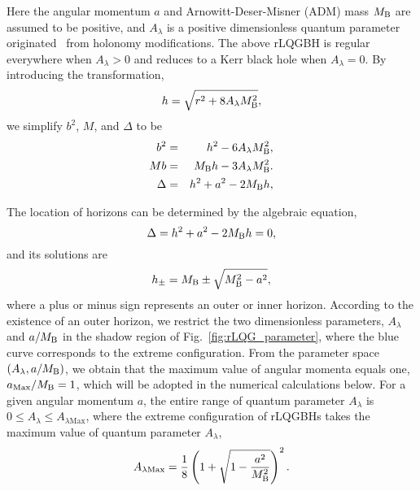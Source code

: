 \documentclass[12pt]{article}
\begin{document}
Here the angular momentum $a$ and Arnowitt-Deser-Misner (ADM) mass $M_{\rm B}$ are assumed to be positive, and $A_\lambda$ is a positive dimensionless quantum parameter originated~\cite{Bodendorfer:2019nvy} from holonomy modifications.
The above rLQGBH is regular~\cite{Brahma:2020eos} everywhere when $A_\lambda>0$ and reduces to a Kerr black hole when $A_\lambda=0$.
By introducing the  transformation, 
\begin{equation}\label{eq:h}
h=\sqrt{r^2+8A_\lambda M_{\rm B}^2},
\end{equation}
we simplify  $b^2$,  $M$, and $\Delta$ to be 
\begin{eqnarray}
b^2&=&h^2-6A_\lambda M_{\rm B}^2,\label{eq:b2}\\
Mb&=&M_{\rm B}h-3A_\lambda M_{\rm B}^2.\label{eq:Mb2}\\
\Delta&=&h^2+a^2 -2M_{\rm B}h,\label{eq:Delta2}
\end{eqnarray}
   
The location of horizons can be determined by the algebraic equation,
\begin{equation}\label{eq:horizon}
		\Delta=h^2+a^2-2M_{\rm B}h=0,
\end{equation}
and its solutions are
\begin{equation}\label{eq:horizon2}
    	h_\pm=M_{\rm B}\pm \sqrt{M_{\rm B}^2-a^2},
\end{equation}
where a plus or minus sign represents an outer or inner horizon.
According to the existence of an outer  horizon, we restrict the two dimensionless parameters, $A_\lambda$ and $a/M_{\rm B}$ in the shadow region of  Fig.~\ref{fig:rLQG_parameter}, where the blue curve corresponds to the extreme configuration. From the parameter space $(A_\lambda, a/M_{\rm B})$, we obtain that the maximum value of  angular momenta equals one, $a_{\rm Max}/{M_{\rm B}}=1$, which will be adopted in the numerical calculations below. For a given angular momentum $a$, the entire range of quantum parameter $A_\lambda$ is $0\le A_\lambda\le A_{\lambda \mathrm{Max}}$, where
the extreme configuration of rLQGBHs takes the maximum value of quantum parameter $A_{\lambda}$,
\begin{equation}
    A_{\lambda \mathrm{Max}}=\frac{1}{8}\left(1+\sqrt{1-\frac{a^2}{M_{\rm B}^2}}\right)^2.\label{max}
\end{equation}
\end{document}
